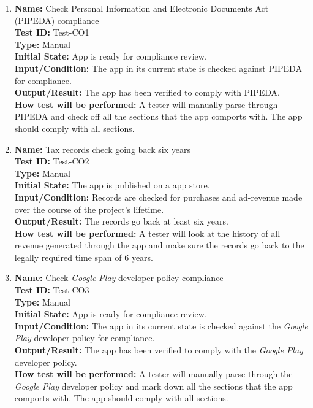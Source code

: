 \documentclass[12pt, titlepage]{article}
\begin{document}
\begin{enumerate}

  \item
        \textbf{Name:} Check Personal Information and Electronic
        Documents Act (PIPEDA) \cite{PIPEDA} compliance \label{itm:Test-CO1} \\
        \textbf{Test ID:} Test-CO1 \\
        \textbf{Type:} Manual \\
        \textbf{Initial State:} App is ready for compliance review. \\
        \textbf{Input/Condition:} The app in its current state is checked against PIPEDA for compliance. \\
        \textbf{Output/Result:} The app has been verified to comply with PIPEDA. \\
        \textbf{How test will be performed:} A tester will manually parse through PIPEDA and check off all the sections that the app comports with. The app should comply with all sections.

  \item
        \textbf{Name:} Tax records check going back six years \label{itm:Test-CO2} \\
        \textbf{Test ID:} Test-CO2 \\
        \textbf{Type:} Manual \\
        \textbf{Initial State:} The app is published on a app store. \\
        \textbf{Input/Condition:} Records are checked for purchases and ad-revenue made over the course of the project's lifetime. \\
        \textbf{Output/Result:} The records go back at least six years. \\
        \textbf{How test will be performed:} A tester will look at the history of all revenue generated through the app and make sure the records go back to the legally required time span of 6 years.

  \item
        \textbf{Name:} Check \textit{Google Play} developer policy \cite{GooglePlay} compliance \label{itm:Test-CO3} \\
        \textbf{Test ID:} Test-CO3 \\
        \textbf{Type:} Manual \\
        \textbf{Initial State:} App is ready for compliance review. \\
        \textbf{Input/Condition:} The app in its current state is checked against the \textit{Google Play} developer policy for compliance. \\
        \textbf{Output/Result:} The app has been verified to comply with the \textit{Google Play} developer policy. \\
        \textbf{How test will be performed:} A tester will manually parse through the \textit{Google Play} developer policy and mark down all the sections that the app comports with. The app should comply with all sections.


\end{enumerate}
\end{document}
